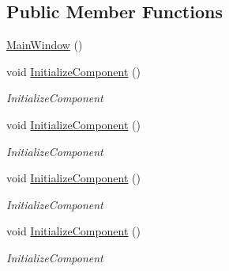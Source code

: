 \subsection*{Public Member Functions}
\begin{DoxyCompactItemize}
\item 
\hyperlink{class_c_p_u___o_s___simulator_1_1_compiler_tester_1_1_main_window_a067de72c2192f57acab21aec73dd8074}{Main\+Window} ()
\item 
void \hyperlink{class_c_p_u___o_s___simulator_1_1_compiler_tester_1_1_main_window_a660feb0d1d06a39586989a4a9e5352ce}{Initialize\+Component} ()
\begin{DoxyCompactList}\small\item\em Initialize\+Component \end{DoxyCompactList}\item 
void \hyperlink{class_c_p_u___o_s___simulator_1_1_compiler_tester_1_1_main_window_a660feb0d1d06a39586989a4a9e5352ce}{Initialize\+Component} ()
\begin{DoxyCompactList}\small\item\em Initialize\+Component \end{DoxyCompactList}\item 
void \hyperlink{class_c_p_u___o_s___simulator_1_1_compiler_tester_1_1_main_window_a660feb0d1d06a39586989a4a9e5352ce}{Initialize\+Component} ()
\begin{DoxyCompactList}\small\item\em Initialize\+Component \end{DoxyCompactList}\item 
void \hyperlink{class_c_p_u___o_s___simulator_1_1_compiler_tester_1_1_main_window_a660feb0d1d06a39586989a4a9e5352ce}{Initialize\+Component} ()
\begin{DoxyCompactList}\small\item\em Initialize\+Component \end{DoxyCompactList}\end{DoxyCompactItemize}
